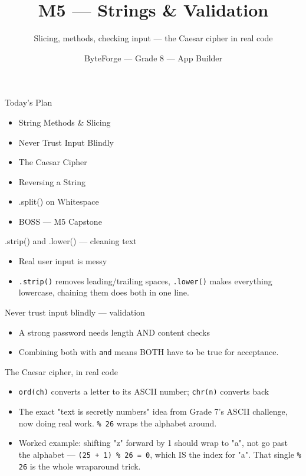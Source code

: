 \documentclass[aspectratio=169]{beamer}
\title{M5 — Strings \& Validation}
\subtitle{Slicing, methods, checking input — the Caesar cipher in real code}
\author{ByteForge --- Grade 8 --- App Builder}
\date{}
\begin{document}
\begin{frame}
    \titlepage
\end{frame}

\begin{frame}{Today's Plan}
    \begin{itemize}
        \item String Methods \& Slicing
        \item Never Trust Input Blindly
        \item The Caesar Cipher
        \item Reversing a String
        \item .split() on Whitespace
        \item[$\bigstar$] BOSS --- M5 Capstone
    \end{itemize}
\end{frame}

\begin{frame}{.strip() and .lower() — cleaning text}
    \large
    \begin{itemize}
        \item Real user input is messy
        \item \texttt{.strip()} removes leading/trailing spaces, \texttt{.lower()} makes everything lowercase, chaining them does both in one line.
    \end{itemize}
\end{frame}


\begin{frame}{Never trust input blindly — validation}
    \large
    \begin{itemize}
        \item A strong password needs length AND content checks
        \item Combining both with \texttt{and} means BOTH have to be true for acceptance.
    \end{itemize}
\end{frame}


\begin{frame}{The Caesar cipher, in real code}
    \large
    \begin{itemize}
        \item \texttt{ord(ch)} converts a letter to its ASCII number; \texttt{chr(n)} converts back
        \item The exact "text is secretly numbers" idea from Grade 7's ASCII challenge, now doing real work. \texttt{\% 26} wraps the alphabet around.
        \item Worked example: shifting "z" forward by 1 should wrap to "a", not go past the alphabet — \texttt{(25 + 1) \% 26 = 0}, which IS the index for "a". That single \texttt{\% 26} is the whole wraparound trick.
    \end{itemize}
\end{frame}
\end{document}
